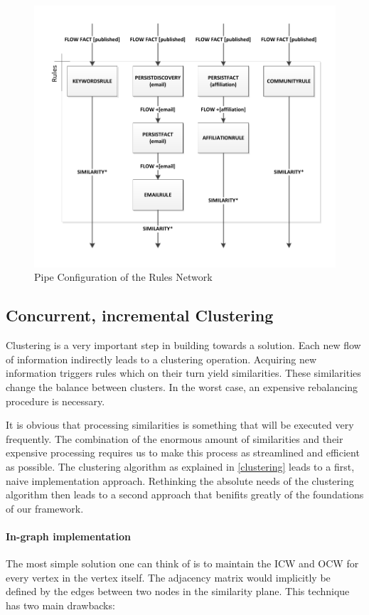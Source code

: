 \begin{figure}[htb]
	\centering
		\includegraphics[width=1\textwidth]{fig/rulespipe}
	\caption{Pipe Configuration of the Rules Network}
	\label{fig:rulespipe}
\end{figure}

\subsection{Concurrent, incremental Clustering}

Clustering is a very important step in building towards a solution. Each new flow of information indirectly leads to a clustering operation. Acquiring new information triggers rules which on their turn yield similarities. These similarities change the balance between clusters. In the worst case, an expensive rebalancing procedure is necessary.

It is obvious that processing similarities is something that will be executed very frequently. The combination of the enormous amount of similarities and their expensive processing requires us to make this process as streamlined and efficient as possible. The clustering algorithm as explained in \autoref{clustering} leads to a first, naive implementation approach. Rethinking the absolute needs of the clustering algorithm then leads to a second approach that benifits greatly of the foundations of our framework.

\paragraph{In-graph implementation} The most simple solution one can think of is to maintain the ICW and OCW for every vertex in the vertex itself. The adjacency matrix would implicitly be defined by the edges between two nodes in the similarity plane. This technique has two main drawbacks:

